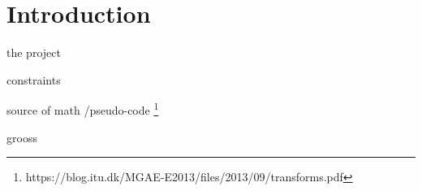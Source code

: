 \section{Introduction}
the project

constraints

source of math /pseudo-code
\footnote{https://blog.itu.dk/MGAE-E2013/files/2013/09/transforms.pdf}

grooss